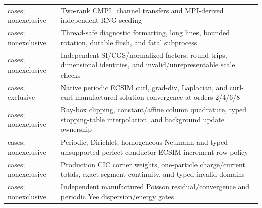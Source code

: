 \begin{longtable}{L{0.38\textwidth}L{0.51\textwidth}}
 cases; nonexclusive & Two-rank CMPI\_channel transfers and MPI-derived independent RNG seeding\newline{}\\
 cases; nonexclusive & Thread-safe diagnostic formatting, long lines, bounded rotation, durable flush, and fatal subprocess\newline{}\\
 cases; nonexclusive & Independent SI/CGS/normalized factors, round trips, dimensional identities, and invalid/unrepresentable scale checks\newline{}\\
 cases; exclusive & Native periodic ECSIM curl, grad-div, Laplacian, and curl-curl manufactured-solution convergence at orders 2/4/6/8\newline{}\\
 cases; nonexclusive & Ray-box clipping, constant/affine column quadrature, typed stopping-table interpolation, and background update ownership\newline{}\\
 cases; nonexclusive & Periodic, Dirichlet, homogeneous-Neumann and typed unsupported perfect-conductor ECSIM increment-row policy\newline{}\\
 cases; nonexclusive & Production CIC corner weights, one-particle charge/current totals, exact segment continuity, and typed invalid domains\newline{}\\
 cases; nonexclusive & Independent manufactured Poisson residual/convergence and periodic Yee dispersion/energy gates\newline{}\\

\end{longtable}
